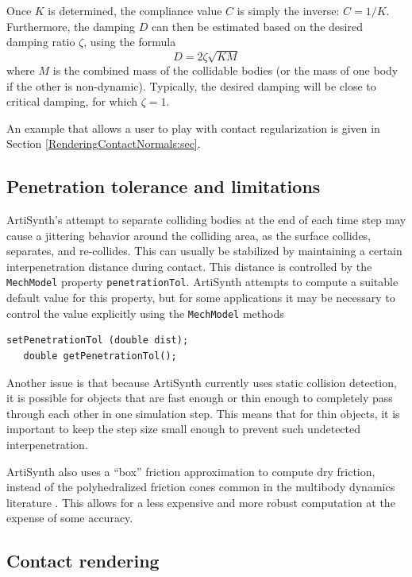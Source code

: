 Once $K$ is determined, the compliance value $C$ is simply the
inverse: $C = 1/K$. Furthermore, the damping $D$ can then be estimated
based on the desired damping ratio $\zeta$, using the formula
%
\begin{equation}
D = 2 \zeta \sqrt{K M}
\label{contactDamping:eqn}
\end{equation}
%
where $M$ is the combined mass of the collidable bodies (or the mass
of one body if the other is non-dynamic).  Typically, the desired
damping will be close to critical damping, for which $\zeta = 1$.

An example that allows a user to play with contact regularization is
given in Section \ref{RenderingContactNormals:sec}.

\subsection{Penetration tolerance and limitations}
\label{ContactLimitations:sec}

ArtiSynth's attempt to separate colliding bodies at the end of each
time step may cause a jittering behavior around the colliding area, as
the surface collides, separates, and re-collides.  This can usually be
stabilized by maintaining a certain interpenetration distance during
contact. This distance is controlled by the {\tt MechModel} property
{\tt penetrationTol}.  ArtiSynth attempts to compute a suitable
default value for this property, but for some applications it may be
necessary to control the value explicitly using the {\tt MechModel}
methods
%
\begin{lstlisting}[]
   setPenetrationTol (double dist);
   double getPenetrationTol();
\end{lstlisting}
%

Another issue is that because ArtiSynth currently uses static
collision detection, it is possible for objects that are fast enough
or thin enough to completely pass through each other in one simulation
step. This means that for thin objects, it is important to keep the
step size small enough to prevent such undetected interpenetration.

ArtiSynth also uses a ``box'' friction approximation
\cite{Lacoursiere07} to compute dry friction, instead of the
polyhedralized friction cones common in the multibody dynamics
literature \cite{AnitescuPotra2002,PotraEtAlTrapezoidal2006}.  This
allows for a less expensive and more robust computation at the expense
of some accuracy.

\subsection{Contact rendering}
\label{ContactRendering:sec}

